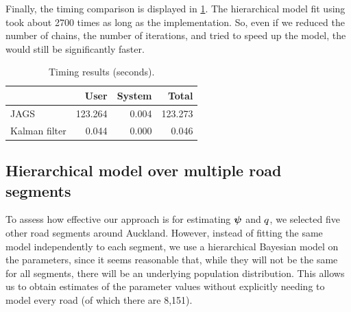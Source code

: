 Finally, the timing comparison is displayed in \cref{tab:nw_model_n1_timecomp}. The hierarchical model fit using  took about 2700 times as long as the \kf{} implementation. So, even if we reduced the number of chains, the number of iterations, and tried to speed up the  model, the \kf{} would still be significantly faster.


\begin{table}

\caption{\label{tab:nw_model_n1_timecomp}Timing results (seconds).}
\centering
\begin{tabular}[b]{lrrr}
\toprule
  & User & System & Total\\
\midrule
JAGS & 123.264 & 0.004 & 123.273\\
Kalman filter & 0.044 & 0.000 & 0.046\\
\bottomrule
\end{tabular}
\end{table}




\subsection{Hierarchical model over multiple road segments}
\label{sec:nw_par_est_multiple}



To assess how effective our approach is for estimating $\mathbf{\boldsymbol{\psi}}$ and $q$, we selected five other road segments around Auckland. However, instead of fitting the same model independently to each segment,  we use a hierarchical Bayesian model on the parameters, since it seems reasonable that, while they will not be the same for all segments, there will be an underlying population distribution. This allows us to obtain estimates of the parameter values without explicitly needing to model every road (of which there are 8,151).


